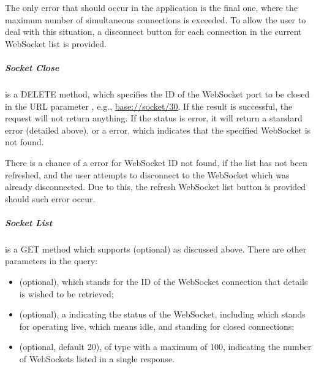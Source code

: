 The only error that should occur in the application is the final one, where the maximum number of simultaneous connections is exceeded. To allow the user to deal with this situation, a disconnect button for each connection in the current WebSocket list is provided.

\subparagraph{Socket Close}

 is a DELETE method, which specifies the ID of the WebSocket port to be closed in the URL parameter , e.g., \url{base://socket/30}. If the result is successful, the request will not return anything. If the status is error, it will return a standard error (detailed above), or a  error, which indicates that the specified WebSocket  is not found.

There is a chance of a  error for WebSocket ID not found, if the list has not been refreshed, and the user attempts to disconnect to the WebSocket which was already disconnected. Due to this, the refresh WebSocket list button is provided should such error occur.

\subparagraph{Socket List}

 is a GET method which supports  (optional) as discussed above. There are other parameters in the query:
\begin{itemize}
    \item {} (optional), which stands for the ID of the WebSocket connection that details is wished to be retrieved;
    \item {} (optional), a  indicating the status of the WebSocket, including  which stands for operating live,  which means idle, and  standing for closed connections;
    \item {} (optional, default 20), of type  with a maximum of 100, indicating the number of WebSockets listed in a single response.
\end{itemize}

